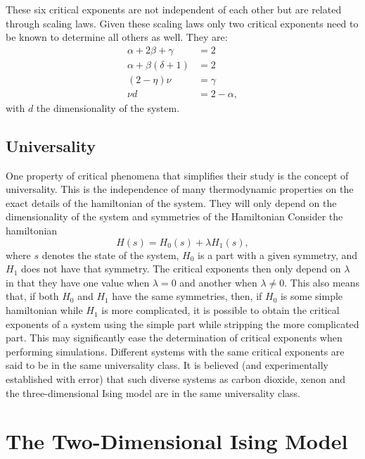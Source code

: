 \documentclass[11pt, a4paper]{report} %
\begin{document}
These six critical exponents are not independent of each other but are related through scaling laws.
Given these scaling laws only two critical exponents need to be known to determine all others as well.
They are:
\begin{align}
	\alpha + 2\beta +\gamma &= 2\\
	\alpha + \beta(\delta+1) &= 2\\
	(2-\eta)\nu &= \gamma \\
	\nu d &= 2- \alpha,
\end{align}
with \(d\) the dimensionality of the system.\cite{binney:1992,baxter:1989,landau:2015}


\subsection{Universality}
One property of critical phenomena that simplifies their study is the concept of universality.
This is the independence of many thermodynamic properties on the exact details of the hamiltonian of the system.
They will only depend on the dimensionality of the system and symmetries of the Hamiltonian
Consider the hamiltonian
\begin{equation}
	H(s) = H_0(s) + \lambda H_1(s),
\end{equation}
where \(s\) denotes the state of the system, \(H_0\) is a part with a given symmetry, and \(H_1\) does not have that symmetry.
The critical exponents then only depend on \(\lambda\) in that they have one value when \(\lambda=0\) and another when \(\lambda \neq 0\).
This also means that, if both \(H_0\) and \(H_1\) have the same symmetries, then, if \(H_0\) is some simple hamiltonian while \(H_1\) is more complicated, it is possible to obtain the critical exponents of a system using the simple part while stripping the more complicated part.
This may significantly ease the determination of critical exponents when performing simulations.
Different systems with the same critical exponents are said to be in the same universality class.
It is believed (and experimentally established with error) that such diverse systems as carbon dioxide, xenon and the three-dimensional Ising model are in the same universality class.\cite{baxter:1989}

\section{The Two-Dimensional Ising Model}\label{sec:ising_model}
\end{document}
